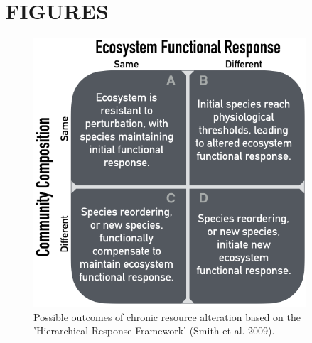 \documentclass[fleqn,10pt,lineno]{wlpeerj} %
\begin{document}
\newpage{}

\hypertarget{figures}{%
\section{FIGURES}\label{figures}}

\begin{figure}[!ht]
  \centering
      \includegraphics[width=4in]{../figures/hypothesis_figtable.png}
  \caption{Possible outcomes of chronic resource alteration based on the 'Hierarchical Response Framework' (Smith et al. 2009).}
\end{figure}

\newpage{}
\end{document}
